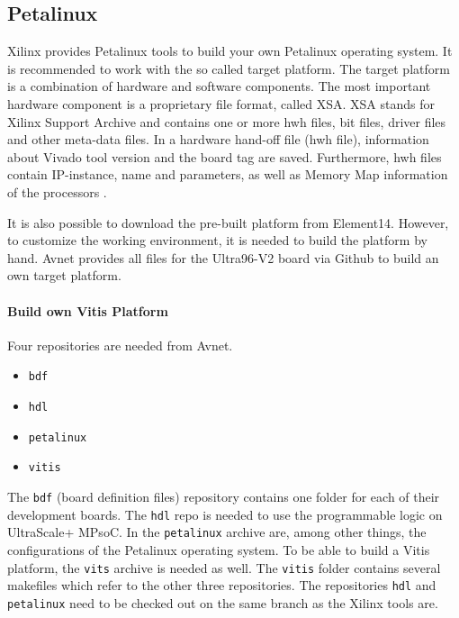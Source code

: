 \subsection{Petalinux}
\label{subsec:embedded_platform:operating_systems:petalinux}

Xilinx provides Petalinux tools to build your own Petalinux operating system.
It is recommended to work with the so called target platform.
The target platform is a combination of hardware and software components.
The most important hardware component is a proprietary file format, called XSA.
XSA stands for Xilinx Support Archive and contains one or more hwh files, bit files, driver files and other meta-data files.
In a hardware hand-off file (hwh file), information about Vivado tool version and the board tag are saved.
Furthermore, hwh files contain IP-instance, name and parameters, as well as Memory Map information of the processors \cite{vitis_user_guide}.

It is also possible to download the pre-built platform from Element14.
However, to customize the working environment, it is needed to build the platform by hand.
Avnet provides all files for the Ultra96-V2 board via Github to build an own target platform.

\paragraph{Build own Vitis Platform}
Four repositories are needed from Avnet.
\begin{itemize}
	\item \texttt{bdf}
	\item \texttt{hdl}
	\item \texttt{petalinux}
	\item \texttt{vitis}
\end{itemize}

The \texttt{bdf} (board definition files) repository contains one folder for each of their development boards.
The \texttt{hdl} repo is needed to use the programmable logic on UltraScale+ MPsoC.
In the \texttt{petalinux} archive are, among other things, the configurations of the Petalinux operating system.
To be able to build a Vitis platform, the \texttt{vits} archive is needed as well.
The \texttt{vitis} folder contains several makefiles which refer to the other three repositories.
The repositories \texttt{hdl} and \texttt{petalinux} need to be checked out on the same branch as the Xilinx tools are.

